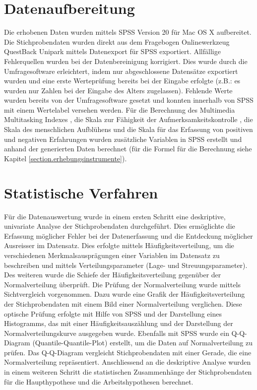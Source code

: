 \section{Datenaufbereitung}\label{section.datenaufbereitung}
Die erhobenen Daten wurden mittels SPSS Version 20 für Mac OS X aufbereitet. Die Stichprobendaten wurden direkt aus dem Fragebogen Onlinewerkzeug QuestBack Unipark mittels Datenexport für SPSS exportiert. Allfällige Fehlerquellen wurden bei der Datenbereinigung korrigiert. Dies wurde durch die Umfragesoftware erleichtert, indem nur abgeschlossene Datensätze exportiert wurden und eine erste Werteprüfung bereits bei der Eingabe erfolgte (z.B.: es wurden nur Zahlen bei der Eingabe des Alters zugelassen). Fehlende Werte wurden bereits von der Umfragesoftware gesetzt und konnten innerhalb von SPSS mit einem Wertelabel versehen werden. Für die Berechnung des Multimedia Multitasking Indexes \cite{Ophir2009}, die Skala zur Fähigkeit der Aufmerksamkeitskontrolle \cite{Posner1998}, die Skala des menschlichen Aufblühens \cite{Diener:2010} und die Skala für das Erfassung von positiven und negativen Erfahrungen \cite{Diener:2010} wurden zusätzliche Variablen in SPSS erstellt und anhand der generierten Daten berechnet (für die Formel für die Berechnung siehe Kapitel \ref{section.erhebungsinstrumente}). 

\section{Statistische Verfahren}\label{section.statistischeVerfahren}
Für die Datenauswertung wurde in einem ersten Schritt eine deskriptive, univariate Analyse der Stichprobendaten durchgeführt. Dies ermöglichte die Erfassung möglicher Fehler bei der Datenerfassung und die Entdeckung möglicher Ausreisser im Datensatz. Dies erfolgte mittels Häufigkeitsverteilung, um die verschiedenen Merkmalsausprägungen einer Variablen im Datensatz zu beschreiben und mittels Verteilungsparameter (Lage- und Streuungsparameter). Des weiteren wurde die Schiefe der Häufigkeitsverteilung gegenüber der Normalverteilung überprüft. Die Prüfung der Normalverteilung wurde mittels Sichtvergleich vorgenommen. Dazu wurde eine Grafik der Häufigkeitsverteilung der Stichprobendaten mit einem Bild einer Normalverteilung verglichen. Diese optische Prüfung erfolgte mit Hilfe von SPSS und der Darstellung eines Histogramms, das mit einer Häufigkeitsauszählung und der Darstellung der Normalverteilungskurve ausgegeben wurde. Ebenfalls mit SPSS wurde ein Q-Q-Diagram (Quantile-Quantile-Plot) erstellt, um die Daten auf Normalverteilung zu prüfen. Das Q-Q-Diagram vergleicht Stichprobendaten mit einer Gerade, die eine Normalverteilung repräsentiert. Anschliessend an die deskriptive Analyse wurden in einem weiteren Schritt die statistischen Zusammenhänge der Stichprobendaten für die Haupthypothese und die Arbeitshypothesen berechnet. 

